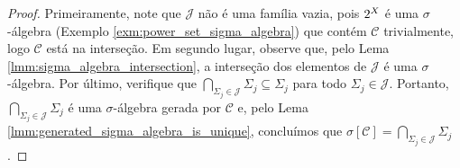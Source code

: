 \begin{proof}
    Primeiramente, note que $\mathcal{J}$ não é uma família vazia, pois $2^{X}$ é uma $\sigma$-álgebra (Exemplo \ref{exm:power_set_sigma_algebra}) que contém $\mathcal{C}$ trivialmente, logo $\mathcal{C}$ está na interseção. Em segundo lugar, observe que, pelo Lema \ref{lmm:sigma_algebra_intersection}, a interseção dos elementos de $\mathcal{J}$ é uma $\sigma$-álgebra. Por último, verifique que $\bigcap_{\Sigma_j\in\mathcal{J}} \Sigma_{j} \subseteq \Sigma_j$ para todo $\Sigma_j \in \mathcal{J}$. Portanto, $\bigcap_{\Sigma_j\in\mathcal{J}} \Sigma_{j}$ é uma $\sigma$-álgebra gerada por $\mathcal{C}$ e, pelo Lema \ref{lmm:generated_sigma_algebra_is_unique}, concluímos que $\sigma [\mathcal{C}] = \bigcap_{\Sigma_j\in\mathcal{J}} \Sigma_{j}$.
\end{proof}